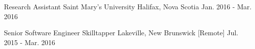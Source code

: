 

\begin{cventries}

  \cventry
    {Research Assistant} %
    {Saint Mary's University} %
    {Halifax, Nova Scotia} %
    {Jan. 2016 - Mar. 2016} %
    {
    }

  \cventry
    {Senior Software Engineer} %
    {Skilltapper} %
    {Lakeville, New Brunswick [Remote]} %
    {Jul. 2015 - Mar. 2016} %
    {
      \begin{cvitems} %
      \end{cvitems}
    }


\end{cventries}
